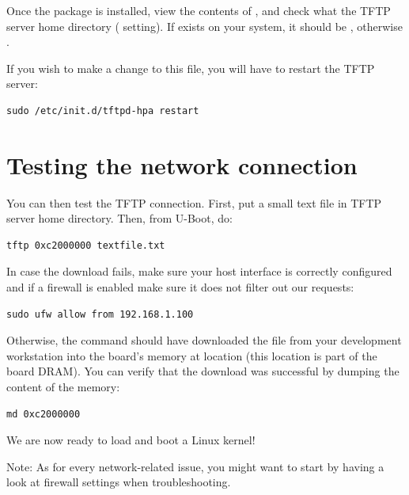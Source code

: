 Once the package is installed, view the contents of
, and check what the TFTP server home directory
( setting). If  exists on your system,
it should be , otherwise .

If you wish to make a change to this file, you will have to restart the TFTP server:

\begin{verbatim}
sudo /etc/init.d/tftpd-hpa restart
\end{verbatim}

\section{Testing the network connection}

You can then test the TFTP connection. First, put a small text
file in TFTP server home directory. Then, from U-Boot, do:

\begin{verbatim}
tftp 0xc2000000 textfile.txt
\end{verbatim}

In case the download fails, make sure your host interface is correctly
configured and if a firewall is enabled make sure it does not filter out our
requests:
\begin{verbatim}
sudo ufw allow from 192.168.1.100
\end{verbatim}

Otherwise, the  command should have downloaded the
 file from your development workstation into the
board's memory at location  (this location is part of
the board DRAM). You can verify that the download was successful by
dumping the content of the memory:

\begin{verbatim}
md 0xc2000000
\end{verbatim}

We are now ready to load and boot a Linux kernel!

Note: As for every network-related issue, you might want to start by
having a look at firewall settings when troubleshooting.
